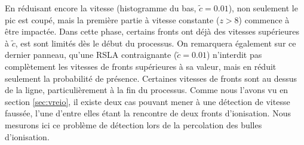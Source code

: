 En réduisant encore la vitesse (histogramme du bas, $\tilde{c}=0.01$), non seulement le pic est coupé, mais la première partie à vitesse constante ($z>8$) commence à être impactée.
Dans cette phase, certains fronts ont déjà des vitesses supérieures à $\tilde{c}$, est sont limités dès le début du processus.
On remarquera également sur ce dernier panneau, qu'une \ac{RSLA} contraignante ($\tilde{c}=0.01$) n'interdit pas complètement les vitesses de fronts supérieures à sa valeur, mais en réduit seulement la probabilité de présence.
Certaines vitesses de fronts sont au dessus de la ligne, particulièrement à la fin du processus.
Comme nous l'avons vu en section \ref{sec:vreio}, il existe deux cas pouvant mener à une détection de vitesse faussée, l'une d'entre elles étant la rencontre de deux fronts d'ionisation.
Nous mesurons ici ce problème de détection lors de la percolation des bulles d'ionisation.


%


